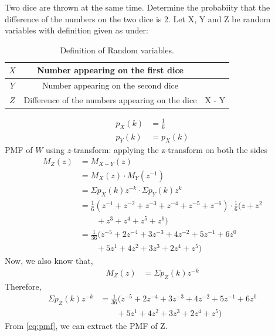 \documentclass[]{article}
\begin{document}
\providecommand{\qfunc}[1]{\ensuremath{Q\left(#1\right)}}
\providecommand{\gauss}[2]{\mathcal{N}\ensuremath{\left(#1,#2\right)}}
\providecommand{\diff}[2]{\ensuremath{\frac{d{#1}}{d{#2}}}}
\providecommand{\myceil}[1]{\left \lceil #1 \right \rceil }
\newcommand\figref{Fig.~\ref}
\newcommand\tabref{Table~\ref}
\newcommand{\sinc}{\,\text{sinc}\,}
\newcommand{\rect}{\,\text{rect}\,}

\let\vec\mathbf

Two dice are thrown at the same time. Determine the probabiity that the difference
of the numbers on the two dice is 2. 
\fi
\solution
Let X, Y and Z be random variables with definition given as under:
\begin{table}[H]
\centering
\begin{tabular}{|c|c|c|}
    \hline
    $X$ & Number appearing on the first dice & \\
    \hline
    $Y$ & Number appearing on the second dice & \\
    \hline
    $Z$ & Difference of the numbers appearing on the dice & X - Y\\
    \hline
\end{tabular}
\label{tab:ncert/10/13/3/1/}
\caption{Definition of Random variables.}
\end{table}

\begin{align}
    p_X(k) &= \frac{1}{6}\\
	p_Y(k) &= p_X(k) 
\end{align}
PMF of $W$ using $z$-transform:
applying the z-transform on both the sides
\begin{align}
	M_Z(z) &= M_{X-Y}(z)\\
	&= M_X(z)\cdot M_Y(z^{-1})\\
  &= \Sigma p_X(k)z^{-k} \cdot \Sigma p_Y(k)z^{k}\\
  &= \frac{1}{6}(z^{-1}+z^{-2}\nonumber+z^{-3}+z^{-4}+z^{-5}+z^{-6}) \cdot \frac{1}{6}(z+z^2 \\&\qquad +z^3+z^4+z^5+z^6) \\
  &= \frac{1}{36}(z^{-5}+2z^{-4}+3z^{-3}+4z^{-2}+5z^{-1}+6z^{0}\nonumber\\&\qquad+5z^{1}+4z^{2}+3z^{3}+2z^{4}+z^{5})
\end{align}
Now, we also know that, 
\begin{align}
	M_Z(z) &= \Sigma p_Z(k)z^{-k}
\end{align}
Therefore, 
\begin{align}
	\Sigma p_Z(k)z^{-k} &= \frac{1}{36}(z^{-5}+2z^{-4}+3z^{-3}+4z^{-2}+5z^{-1}+6z^{0}\nonumber\\&\qquad+5z^{1}+4z^{2}+3z^{3}+2z^{4}+z^{5}) \label{eq:pmf}
\end{align}
From \eqref{eq:pmf}, we can extract the PMF of Z.
\end{document}
